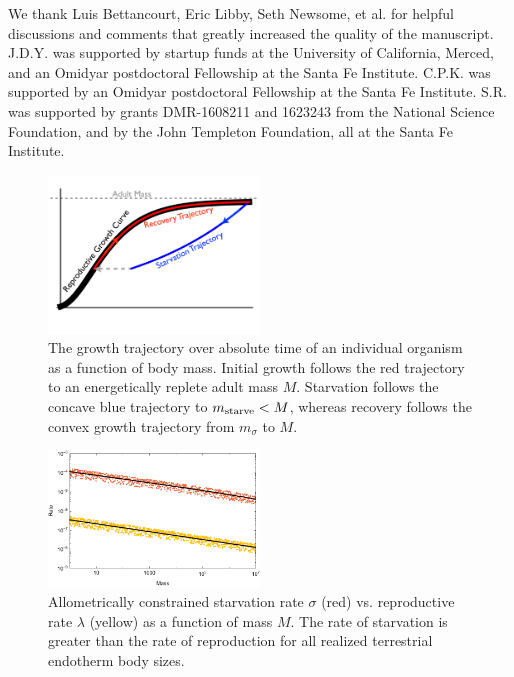 \documentclass{pnastwo}
\begin{document}
\begin{article}



\begin{acknowledgments}
We thank Luis Bettancourt, Eric Libby, Seth Newsome, et al. for helpful discussions and comments that greatly increased the quality of the manuscript.
  J.D.Y. was supported by startup funds at the University of California, Merced, and an Omidyar postdoctoral Fellowship at the Santa Fe Institute.
  C.P.K. was supported by an Omidyar postdoctoral Fellowship at the Santa Fe
  Institute.  
  S.R. was supported by grants DMR-1608211 and 1623243 from the National Science Foundation, and by the John Templeton Foundation, all at the Santa Fe Institute.
\end{acknowledgments}






\end{article}






\begin{figure}
\centering
\includegraphics[width=0.5\textwidth]{Growth-trajectory-diagram.pdf}
\caption{
The growth trajectory over absolute time of an individual organism as a function of body mass.
Initial growth follows the red trajectory to an energetically replete adult mass $M$.
Starvation follows the concave blue trajectory to $m_{\rm starve} < M$, whereas recovery follows the convex growth trajectory from $m_\sigma$ to $M$.
}
\label{fig:growth}
\end{figure}

\begin{figure}
\centering
\includegraphics[width=0.5\textwidth]{fig_GvS.pdf}
\caption{
Allometrically constrained starvation rate $\sigma$ (red) vs. reproductive rate $\lambda$ (yellow) as a function of mass $M$.
The rate of starvation is greater than the rate of reproduction for all realized terrestrial endotherm body sizes.
}
\label{fig:gvs}
\end{figure}
\end{document}
